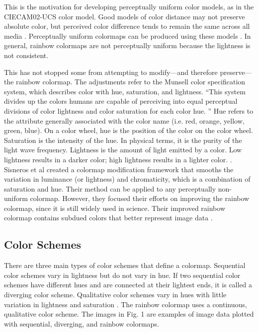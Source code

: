 \documentclass[journal,12pt]{IEEEtran}
\begin{document}
This is the motivation for developing perceptually
uniform color models, as in the CIECAM02-UCS color model. Good models of color
distance may not preserve absolute color, but perceived color difference tends
to remain the same across all media \cite{ciecam02}. Perceptually uniform colormaps
can be produced using these models \cite{viridis}. In general, rainbow colormaps
are not perceptually uniform because the lightness is not consistent.

This has not stopped some from attempting to modify---and therefore preserve---the
rainbow colormap. The adjustments refer to the Munsell color specification system,
which describes color with hue, saturation, and lightness. ``This system
divides up the colors humans are capable of perceiving
into equal perceptual divisions of color lightness and
color saturation for each color hue. \cite{colormapping}''
Hue refers to the attribute generally associated with the color name (i.e. red,
orange, yellow, green, blue). On a color wheel, hue is the position of the color
on the color wheel. Saturation is the intensity of the hue. In
physical terms, it is the purity of the light wave frequency. Lightness is the
amount of light emitted by a color. Low lightness results in a darker color;
high lightness results in a lighter color. \cite{colorguidelines}.
Sisneros et al created a colormap modification framework that smooths the variation
in luminance (or lightness) and chromaticity, which is a combination of saturation
and hue. Their method can be applied to any perceptually non-uniform colormap.
However, they focused their efforts on improving the rainbow colormap, since it is still widely
used in science. Their improved rainbow colormap contains subdued colors that better
represent image data \cite{chasingrainbows}. 

\subsection{Color Schemes}

There are three main types of color schemes that define a colormap.
Sequential color schemes vary in lightness but do not
vary in hue. If two sequential color schemes have different hues and are
connected at their lightest ends, it is called a diverging color scheme. Qualitative color
schemes vary in hues with little variation in lightness
and saturation \cite{colormapping}. The rainbow colormap uses a continuous,
qualitative color scheme. The images in Fig. 1
are examples of image data plotted with 
sequential, diverging, and rainbow colormaps.
\end{document}
